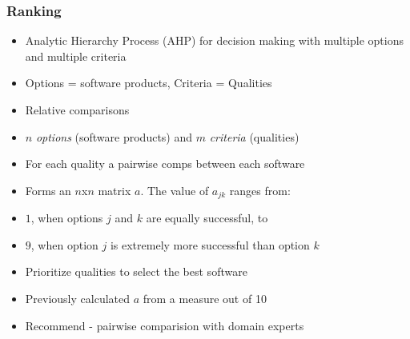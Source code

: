 \documentclass[t,12pt,numbers,fleqn]{beamer}
\begin{document}

\begin{frame}
\frametitle{Ranking}

\begin{itemize}

\item Analytic Hierarchy Process (AHP) for decision making with multiple options
  and multiple criteria
\item Options = software products, Criteria = Qualities
\item Relative comparisons%
\item $n$ \textit{options} (software products) and $m$
\textit{criteria} (qualities)
\item For each quality a pairwise comps between each software
\item Forms an $n$x$n$ matrix $a$.  The value of $a_{jk}$ ranges from:
\bi
\item $1$, when options $j$ and $k$ are equally successful, to 
\item $9$, when option $j$ is extremely more successful than option $k$ 
\ei
\item Prioritize qualities to select the best software%
\item Previously calculated $a$ from a measure out of 10
\item Recommend - pairwise comparision with domain experts
\end{itemize}

\end{frame}

\end{document}
